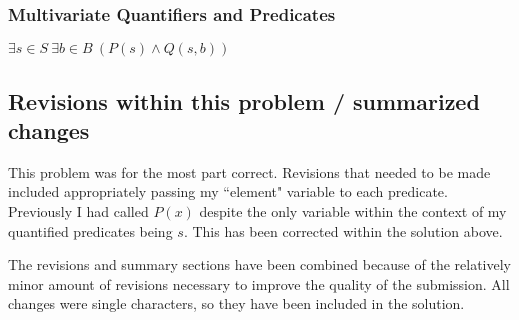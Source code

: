 \documentclass{article}
\begin{document}
\subsubsection{Multivariate Quantifiers and Predicates}
\begin{center}
  $ \exists s \in S~\exists b \in B~(P(s) \land Q(s, b)) $
\end{center}

\subsection{Revisions within this problem / summarized changes}
This problem was for the most part correct. Revisions that needed to be made included appropriately passing my ``element" variable to each predicate. Previously I had called $P(x)$ despite the only variable within the context of my quantified predicates being $s$. This has been corrected within the solution above.

The revisions and summary sections have been combined because of the relatively minor amount of revisions necessary to improve the quality of the submission. All changes were single characters, so they have been included in the solution.
\end{document}
